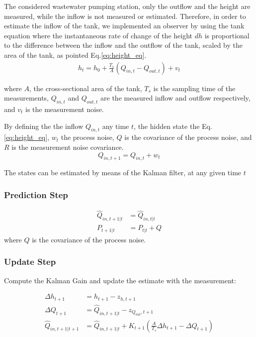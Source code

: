	The considered wastewater pumping station, only the outflow and the height are measured, 
	while the inflow is not measured or estimated. Therefore, in order to estimate the inflow of the tank, 
	we implemented an observer by using the tank equation where the instantaneous rate of change of the height $dh$ is proportional 
	to the difference between the inflow and the outflow of the tank, scaled by the area of the tank, as pointed Eq.\ref{eq:height_eq}.
	\begin{align}
	h_t = h_0 + \frac{T_s}{A}(Q_{in,t} - Q_{out,t}) + v_t \label{eq:height_eq}
	\end{align}

	\noindent where \( A \), the cross-sectional area of the tank, $T_s$ is the sampling time of the measurements,
	$Q_{in,t}$ and $Q_{out,t}$ are the measured inflow and outflow respectively, and $v_t$ is the measurement noise. 

	By defining the the inflow  \( Q_{in,t} \) any time \( t \), the hidden state the 
	Eq.\ref{eq:height_eq}, \( w_t \) the process noise, \( Q \) is the covariance of the process noise, and \( R \) is the measurement noise covariance.
	\[
	Q_{in, t+1} = Q_{in, t} + w_t
	\]
	
	\noindent The states can be estimated by means of the Kalman filter, at any given time \( t \)
	\subsubsection*{Prediction Step}
	\begin{align*}
	\hat{Q}_{in, t+1|t} &= \hat{Q}_{in,t|t} \\
	P_{t+1|t} &= P_{t|t} + Q
	\end{align*}
	where \( Q \) is the covariance of the process noise.

	\subsubsection*{Update Step}
	Compute the Kalman Gain and update the estimate with the measurement:

	\begin{align*}
		\Delta h_{t+1} &= h_{t+1} - z_{h,t+1} \\
		\Delta Q_{t+1} &= \hat{Q}_{in,t+1|t} - z_{Q_{out},t+1} \\
		\hat{Q}_{in,t+1|t+1} &= \hat{Q}_{in,t+1|t} + K_{t+1} \left(\frac{A}{T_s}\Delta h_{t+1} - \Delta Q_{t+1} \right)
		\end{align*}
	
